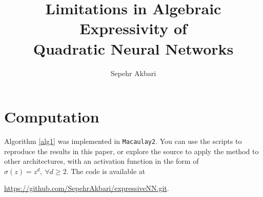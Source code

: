 \documentclass[12pt]{amsproc}
\title[Expressivity of Neural Networks]{Limitations in Algebraic Expressivity of \\Quadratic Neural Networks}
\author{Sepehr Akbari}
\renewcommand{\-}{\setminus}
\newcommand\<{\langle}
\renewcommand\>{\rangle}
\theoremstyle{plain}
\theoremstyle{definition}
\theoremstyle{remark}
\begin{document}


\maketitle






\appendix
\section{Computation}

Algorithm \ref{alg1} was implemented in \texttt{Macaulay2}. You can use the scripts to reproduce the results in this paper, or explore the source to apply the method to other architectures, with an activation function in the form of $\sigma(z) = z^d, \ \forall d \geq 2$. The code is available at 

\qquad \url{https://github.com/SepehrAkbari/expressiveNN.git}.

\vspace{1em}
\end{document}
